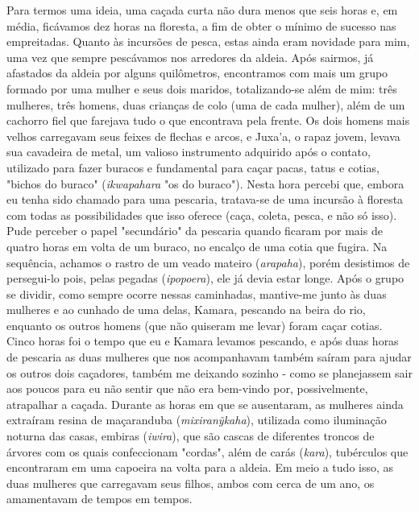 Para termos uma ideia, uma caçada curta não dura menos que seis horas e,
em média, ficávamos dez horas na floresta, a fim de obter o mínimo de
sucesso nas empreitadas. Quanto às incursões de pesca, estas ainda eram
novidade para mim, uma vez que sempre pescávamos nos arredores da
aldeia. Após sairmos, já afastados da aldeia por alguns quilômetros,
encontramos com mais um grupo formado por uma mulher e seus dois
maridos, totalizando-se além de mim: três mulheres, três homens, duas
crianças de colo (uma de cada mulher), além de um cachorro fiel que
farejava tudo o que encontrava pela frente. Os dois homens mais velhos
carregavam seus feixes de flechas e arcos, e Juxa'a, o rapaz jovem,
levava sua cavadeira de metal, um valioso instrumento adquirido após o
contato, utilizado para fazer buracos e fundamental para caçar pacas,
tatus e cotias, "bichos do buraco" (\emph{ikwapahara} "os do buraco").
Nesta hora percebi que, embora eu tenha sido chamado para uma pescaria,
tratava-se de uma incursão à floresta com todas as possibilidades que
isso oferece (caça, coleta, pesca, e não só isso). Pude perceber o papel
"secundário" da pescaria quando ficaram por mais de quatro horas em
volta de um buraco, no encalço de uma cotia que fugira. Na sequência,
achamos o rastro de um veado mateiro (\emph{arapaha}), porém desistimos
de persegui-lo pois, pelas pegadas (\emph{ipopoera}), ele já devia estar
longe. Após o grupo se dividir, como sempre ocorre nessas caminhadas,
mantive-me junto às duas mulheres e ao cunhado de uma delas, Kamara,
pescando na beira do rio, enquanto os outros homens (que não quiseram me
levar) foram caçar cotias. Cinco horas foi o tempo que eu e Kamara
levamos pescando, e após duas horas de pescaria as duas mulheres que nos
acompanhavam também saíram para ajudar os outros dois caçadores, também
me deixando sozinho - como se planejassem sair aos poucos para eu não
sentir que não era bem-vindo por, possivelmente, atrapalhar a caçada.
Durante as horas em que se ausentaram, as mulheres ainda extraíram
resina de maçaranduba (\emph{mixiranỹkaha}), utilizada como iluminação
noturna das casas, embiras (\emph{iwira}), que são cascas de diferentes
troncos de árvores com os quais confeccionam "cordas", além de carás
(\emph{kara}), tubérculos que encontraram em uma capoeira na volta para
a aldeia. Em meio a tudo isso, as duas mulheres que carregavam seus
filhos, ambos com cerca de um ano, os amamentavam de tempos em tempos.

